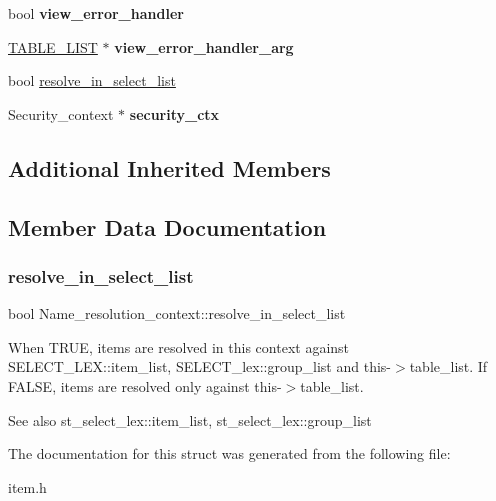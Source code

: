 \begin{DoxyCompactItemize}
bool {\bfseries view\+\_\+error\+\_\+handler}
\item 
\mbox{\label{structName__resolution__context_a6e63cc7cf0e612b054a13519123526fa}} 
\mbox{\hyperlink{structTABLE__LIST}{T\+A\+B\+L\+E\+\_\+\+L\+I\+ST}} $\ast$ {\bfseries view\+\_\+error\+\_\+handler\+\_\+arg}
\item 
bool \mbox{\hyperlink{structName__resolution__context_aa304bdcc6ea8f313533ae27935e9c4c1}{resolve\+\_\+in\+\_\+select\+\_\+list}}
\item 
\mbox{\label{structName__resolution__context_a76aafc103a4a001ac2d785b1394efdd7}} 
Security\+\_\+context $\ast$ {\bfseries security\+\_\+ctx}
\end{DoxyCompactItemize}
\subsection*{Additional Inherited Members}


\subsection{Member Data Documentation}
\mbox{\label{structName__resolution__context_aa304bdcc6ea8f313533ae27935e9c4c1}} 
\subsubsection{\texorpdfstring{resolve\+\_\+in\+\_\+select\+\_\+list}{resolve\_in\_select\_list}}
{\footnotesize\ttfamily bool Name\+\_\+resolution\+\_\+context\+::resolve\+\_\+in\+\_\+select\+\_\+list}

When T\+R\+UE, items are resolved in this context against S\+E\+L\+E\+C\+T\+\_\+\+L\+E\+X\+::item\+\_\+list, S\+E\+L\+E\+C\+T\+\_\+lex\+::group\+\_\+list and this-\/$>$table\+\_\+list. If F\+A\+L\+SE, items are resolved only against this-\/$>$table\+\_\+list.

\begin{DoxySeeAlso}{See also}
st\+\_\+select\+\_\+lex\+::item\+\_\+list, st\+\_\+select\+\_\+lex\+::group\+\_\+list 
\end{DoxySeeAlso}


The documentation for this struct was generated from the following file\+:\begin{DoxyCompactItemize}
\item 
item.\+h\end{DoxyCompactItemize}
